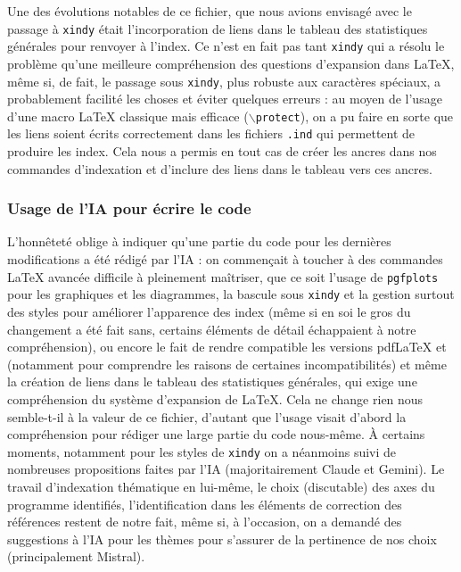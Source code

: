 Une des évolutions notables de ce fichier, que nous avions envisagé avec le passage à \texttt{xindy} était l'incorporation de liens dans le tableau des statistiques générales pour renvoyer à l'index. Ce n'est en fait pas tant \texttt{xindy} qui a résolu le problème qu'une meilleure compréhension des questions d'expansion dans \LaTeX{}, même si, de fait, le passage sous \texttt{xindy}, plus robuste aux caractères spéciaux, a probablement facilité les choses et éviter quelques erreurs : au moyen de l'usage d'une macro \LaTeX{} classique mais efficace (\texttt{$\backslash$protect}), on a pu faire en sorte que les liens soient écrits correctement dans les fichiers \texttt{.ind} qui permettent de produire les index. Cela nous a permis en tout cas de créer les ancres dans nos commandes d'indexation et d'inclure des liens dans le tableau vers ces ancres.

\subsubsection{Usage de l'IA pour écrire le code}

L'honnêteté oblige à indiquer qu'une partie du code pour les dernières modifications a été rédigé par l'IA : on commençait à toucher à des commandes \LaTeX{} avancée difficile à pleinement maîtriser, que ce soit l'usage de \texttt{pgfplots} pour les graphiques et les diagrammes, la bascule sous \texttt{xindy} et la gestion surtout des styles pour améliorer l'apparence des index (même si en soi le gros du changement a été fait sans, certains éléments de détail échappaient à notre compréhension), ou encore le fait de rendre compatible les versions pdf\LaTeX{} et \XeLaTeX{} (notamment pour comprendre les raisons de certaines incompatibilités) et même la création de liens dans le tableau des statistiques générales, qui exige une compréhension du système d'expansion de \LaTeX{}. Cela ne change rien nous semble-t-il à la valeur de ce fichier, d'autant que l'usage visait d'abord la compréhension pour rédiger une large partie du code nous-même. À certains moments, notamment pour les styles de \texttt{xindy} on a néanmoins suivi de nombreuses propositions faites par l'IA (majoritairement Claude et Gemini). Le travail d'indexation thématique en lui-même, le choix (discutable) des axes du programme identifiés, l'identification dans les éléments de correction des références restent de notre fait, même si, à l'occasion, on a demandé des suggestions à l'IA pour les thèmes pour s'assurer de la pertinence de nos choix (principalement Mistral).

